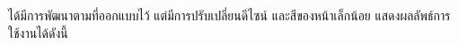 ได้มีการพัฒนาตามที่ออกแบบไว้ แต่มีการปรับเปลี่ยนดีไซน์ และสีของหน้าเล็กน้อย แสดงผลลัพธ์การใช้งานได้ดังนี้



